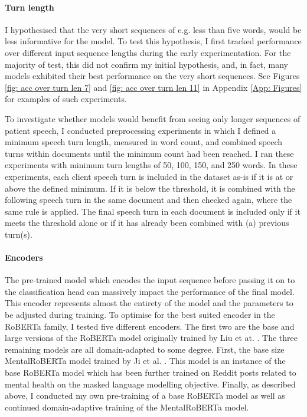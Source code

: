 \documentclass[12pt]{report}
\begin{document}
\paragraph*{Turn length}
I hypothesised that the very short sequences of e.g. less than five words, would be less informative for the model.
To test this hypothesis, I first tracked performance over different input sequence lengths during the early experimentation.
For the majority of test, this did not confirm my initial hypothesis, and, in fact, many models exhibited their best performance on the very short sequences.
See Figures \ref{fig: acc over turn len 7} and \ref{fig: acc over turn len 11} in Appendix \ref{App: Figures} for examples of such experiments.

To investigate whether models would benefit from seeing only longer sequences of patient speech, I conducted preprocessing experiments in which I defined a minimum speech turn length, measured in word count, and combined speech turns within documents until the minimum count had been reached.
I ran these experiments with minimum turn lengths of 50, 100, 150, and 250 words.
In these experiments, each client speech turn is included in the dataset as-is if it is at or above the defined minimum.
If it is below the threshold, it is combined with the following speech turn in the same document and then checked again, where the same rule is applied.
The final speech turn in each document is included only if it meets the threshold alone or if it has already been combined with (a) previous turn(s).

\paragraph*{Encoders}
The pre-trained model which encodes the input sequence before passing it on to the classification head can massively impact the performance of the final model.
This encoder represents almost the entirety of the model and the parameters to be adjusted during training.
To optimise for the best suited encoder in the RoBERTa family, I tested five different encoders.
The first two are the base and large versions of the RoBERTa model originally trained by Liu et at. \citeyear{roberta}.
The three remaining models are all domain-adapted to some degree.
First, the base size MentalRoBERTa model trained by Ji et al. \citeyear{MentalBERT}.
This model is an instance of the base RoBERTa model which has been further trained on Reddit posts related to mental health on the masked language modelling objective.
Finally, as described above, I conducted my own pre-training of a base RoBERTa model as well as continued domain-adaptive training of the MentalRoBERTa model.
\end{document}
